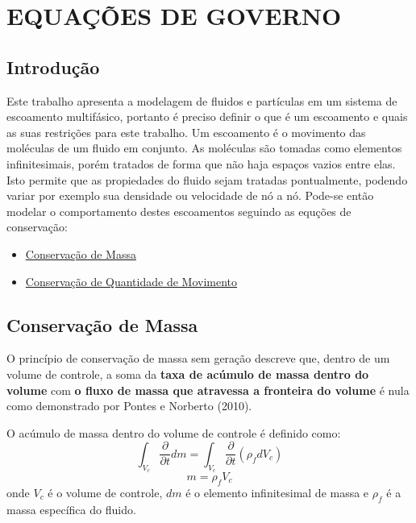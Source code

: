 \chapter{\textbf{EQUAÇÕES DE GOVERNO}}
\label{sec_eq_governo}
\section{\textbf{Introdução}}
Este trabalho apresenta a modelagem de fluidos e partículas em um sistema de escoamento multifásico, portanto é preciso definir o que é um escoamento e quais as suas restrições para este trabalho.
Um escoamento é o movimento das moléculas de um fluido em conjunto.
As moléculas são tomadas como elementos infinitesimais, porém tratados de forma que não haja espaços vazios entre elas.
Isto permite que as propiedades do fluido sejam tratadas pontualmente, podendo variar por exemplo sua densidade ou velocidade de nó a nó.
Pode-se então modelar o comportamento destes escoamentos seguindo as equções de conservação:
\begin{itemize}
	\item \hyperref[cons_massa]{Conservação de Massa}
	\item \hyperref[cons_qmov]{Conservação de Quantidade de Movimento}
\end{itemize}

\section{\textbf{Conservação de Massa}}
\label{sec_cons_massa}
O princípio de conservação de massa sem geração descreve que, dentro de um volume de controle, a soma da \textbf{taxa de acúmulo de massa dentro do volume} com \textbf{o fluxo de massa que atravessa a fronteira do volume} é nula como demonstrado por Pontes e Norberto (2010)\cite{pontes_norberto}.

O acúmulo de massa dentro do volume de controle é definido como:
\begin{equation}
    \int_{V_c}\dfrac{\partial}{\partial t} dm =  \int_{V_c}\dfrac{\partial}{\partial t} (\rho_f d V_c)
    \label{acumulo_massa}
\end{equation}
\begin{equation}
    m =  \rho_f V_c
    \label{densidade}
\end{equation}
onde $V_c$ é o volume de controle, $dm$ é o elemento infinitesimal de massa e $\rho_f$ é a massa específica do fluido.

